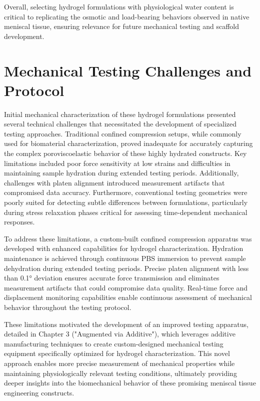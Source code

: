 Overall, selecting hydrogel formulations with physiological water content is critical to replicating the osmotic and load-bearing behaviors observed in native meniscal tissue, ensuring relevance for future mechanical testing and scaffold development.

\newpage
\section{Mechanical Testing Challenges and Protocol}

Initial mechanical characterization of these hydrogel formulations presented several technical challenges that necessitated the development of specialized testing approaches. Traditional confined compression setups, while commonly used for biomaterial characterization, proved inadequate for accurately capturing the complex poroviscoelastic behavior of these highly hydrated constructs. Key limitations included poor force sensitivity at low strains and difficulties in maintaining sample hydration during extended testing periods. Additionally, challenges with platen alignment introduced measurement artifacts that compromised data accuracy. Furthermore, conventional testing geometries were poorly suited for detecting subtle differences between formulations, particularly during stress relaxation phases critical for assessing time-dependent mechanical responses.

To address these limitations, a custom-built confined compression apparatus was developed with enhanced capabilities for hydrogel characterization. Hydration maintenance is achieved through continuous PBS immersion to prevent sample dehydration during extended testing periods. Precise platen alignment with less than 0.1° deviation ensures accurate force transmission and eliminates measurement artifacts that could compromise data quality. Real-time force and displacement monitoring capabilities enable continuous assessment of mechanical behavior throughout the testing protocol.

These limitations motivated the development of an improved testing apparatus, detailed in Chapter 3 ("Augmented via Additive"), which leverages additive manufacturing techniques to create custom-designed mechanical testing equipment specifically optimized for hydrogel characterization. This novel approach enables more precise measurement of mechanical properties while maintaining physiologically relevant testing conditions, ultimately providing deeper insights into the biomechanical behavior of these promising meniscal tissue engineering constructs.

